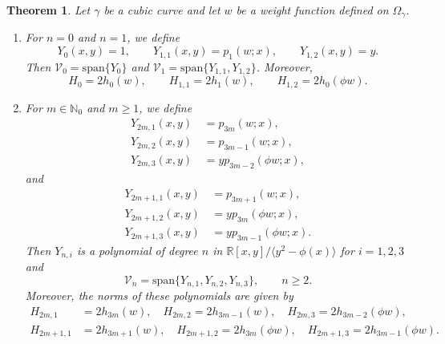 \documentclass{amsart}
\newtheorem{thm}{Theorem}[section]
\theoremstyle{remark}
\def\la{{\langle}}
\def\ra{{\rangle}}
\def\g{{\gamma}}
\def\la{{\langle}}
\def\ra{{\rangle}}
\def\CV{{\mathcal V}}
\def\NN{{\mathbb N}}
\def\RR{{\mathbb R}}
\begin{document}
\begin{thm} \label{thm:OPbasis}
Let $\g$ be a cubic curve and let $w$ be a weight function defined on $\Omega_\g$.
\begin{enumerate}[1.]
\item For $n =0$ and $n=1$, we define
$$
Y_0(x,y) =1, \qquad Y_{1,1}(x,y) = p_1(w;x), \qquad Y_{1,2}(x,y)=y.
$$
Then $\CV_0 = \mathrm{span} \{Y_0\}$ and $\CV_1 =  \mathrm{span} \{Y_{1,1}, Y_{1,2}\}$. Moreover,
$$
   H_0 = 2 h_0(w), \qquad H_{1,1} = 2 h_1(w), \qquad H_{1,2} = 2 h_0(\phi w).
$$
\item For $m \in \NN_0$ and $m \ge 1$, we define 
\begin{align*}
  Y_{2m,1}(x,y) &\, = p_{3m}(w;x), \\
  Y_{2m,2}(x,y) &\,= p_{3m-1}(w;x), \\
  Y_{2m,3}(x,y) &\,= y p_{3m-2}(\phi w; x),
\end{align*}
and 
\begin{align*}
  Y_{2m+1,1}(x,y) &\, = p_{3m+1}(w;x), \\
  Y_{2m+1,2}(x,y) &\,= y p_{3m}(\phi w;x), \\
  Y_{2m+1,3}(x,y) &\,= y p_{3m-1}(\phi w; x).
\end{align*}
Then $Y_{n,i}$ is a polynomial of degree $n$ in $\RR[x,y] / \la y^2 - \phi(x)\ra$ for $i=1,2,3$ and
$$
\CV_n = \mathrm{span} \{Y_{n,1}, Y_{n,2}, Y_{n,3} \}, \qquad n \ge 2.
$$
Moreover,  the norms of these polynomials are given by
\begin{align*}  
H_{2m,1} & = 2 h_{3m}(w), \quad H_{2m,2} = 2 h_{3m-1}(w), \quad H_{2m,3} = 2 h_{3m-2}(\phi w),\\
H_{2m+1,1} & = 2 h_{3m+1}(w), \quad H_{2m+1,2} = 2 h_{3m}(\phi w), \quad H_{2m+1,3} = 2 h_{3m-1}(\phi w).
\end{align*}
\end{enumerate}
\end{thm}
\end{document}
